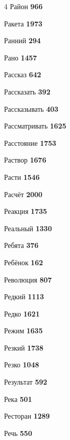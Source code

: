 \begin{multicols}{4}
\noindent Район \dotfill \textbf{\color{secondary} 966}\par
\noindent Ракета \dotfill \textbf{\color{secondary} 1973}\par
\noindent Ранний \dotfill \textbf{\color{secondary} 294}\par
\noindent Рано \dotfill \textbf{\color{secondary} 1457}\par
\noindent Рассказ \dotfill \textbf{\color{secondary} 642}\par
\noindent Рассказать \dotfill \textbf{\color{secondary} 392}\par
\noindent Рассказывать \dotfill \textbf{\color{secondary} 403}\par
\noindent Рассматривать \dotfill \textbf{\color{secondary} 1625}\par
\noindent Расстояние \dotfill \textbf{\color{secondary} 1753}\par
\noindent Раствор \dotfill \textbf{\color{secondary} 1676}\par
\noindent Расти \dotfill \textbf{\color{secondary} 1546}\par
\noindent Расчёт \dotfill \textbf{\color{secondary} 2000}\par
\noindent Реакция \dotfill \textbf{\color{secondary} 1735}\par
\noindent Реальный \dotfill \textbf{\color{secondary} 1330}\par
\noindent Ребята \dotfill \textbf{\color{secondary} 376}\par
\noindent Ребёнок \dotfill \textbf{\color{secondary} 162}\par
\noindent Революция \dotfill \textbf{\color{secondary} 807}\par
\noindent Редкий \dotfill \textbf{\color{secondary} 1113}\par
\noindent Редко \dotfill \textbf{\color{secondary} 1621}\par
\noindent Режим \dotfill \textbf{\color{secondary} 1635}\par
\noindent Резкий \dotfill \textbf{\color{secondary} 1738}\par
\noindent Резко \dotfill \textbf{\color{secondary} 1048}\par
\noindent Результат \dotfill \textbf{\color{secondary} 592}\par
\noindent Река \dotfill \textbf{\color{secondary} 501}\par
\noindent Ресторан \dotfill \textbf{\color{secondary} 1289}\par
\noindent Речь \dotfill \textbf{\color{secondary} 550}\par

\end{multicols}
